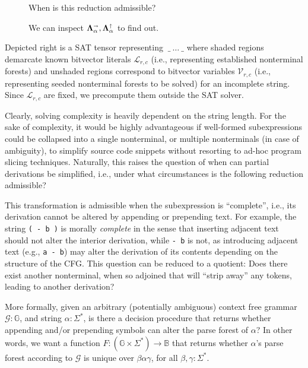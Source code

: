 \documentclass[sigplan,review,anonymous,acmsmall]{acmart}\settopmatter{printfolios=false,printccs=false,printacmref=false}
\begin{document}
\begin{figure}
  \vspace{-20pt}
  \resizebox{0.4\textwidth}{!}{}
  \caption{When is this reduction admissible?}
  \resizebox{0.35\textwidth}{!}{}
  \caption{We can inspect $\bm\Lambda_\alpha^\shortrightarrow, \bm\Lambda_\alpha^\shortuparrow$ to find out.}
\end{figure}

Depicted right is a SAT tensor representing $\:\_\:\ldots\:\_$ where shaded regions demarcate known bitvector literals $\mathcal{L}_{r,c}$ (i.e., representing established nonterminal forests) and unshaded regions correspond to bitvector variables $\mathcal{V}_{r,c}$ (i.e., representing seeded nonterminal forests to be solved) for an incomplete string. Since $\mathcal{L}_{r,c}$ are fixed, we precompute them outside the SAT solver.

Clearly, solving complexity is heavily dependent on the string length. For the sake of complexity, it would be highly advantageous if well-formed subexpressions could be collapsed into a single nonterminal, or multiple nonterminals (in case of ambiguity), to simplify source code snippets without resorting to ad-hoc program slicing techniques. Naturally, this raises the question of when can partial derivations be simplified, i.e., under what circumstances is the following reduction admissible?

This transformation is admissible when the subexpression is ``complete'', i.e., its derivation cannot be altered by appending or prepending text. For example, the string \texttt{( - b )} is morally \textit{complete} in the sense that inserting adjacent text should not alter the interior derivation, while \texttt{- b} is not, as introducing adjacent text (e.g., \texttt{a - b}) may alter the derivation of its contents depending on the structure of the CFG. This question can be reduced to a quotient: Does there exist another nonterminal, when so adjoined that will ``strip away'' any tokens, leading to another derivation?

More formally, given an arbitrary (potentially ambiguous) context free grammar $\mathcal{G}: \mathbb{G}$, and string $\alpha: \Sigma^\ast$, is there a decision procedure that returns whether appending and/or prepending symbols can alter the parse forest of $\alpha$? In other words, we want a function $F: (\mathbb{G} \times \Sigma^\ast) \rightarrow \mathbb{B}$ that returns whether $\alpha$'s parse forest according to $\mathcal{G}$ is unique over $\beta\alpha\gamma$, for all $\beta, \gamma: \Sigma^\ast$.
\end{document}
